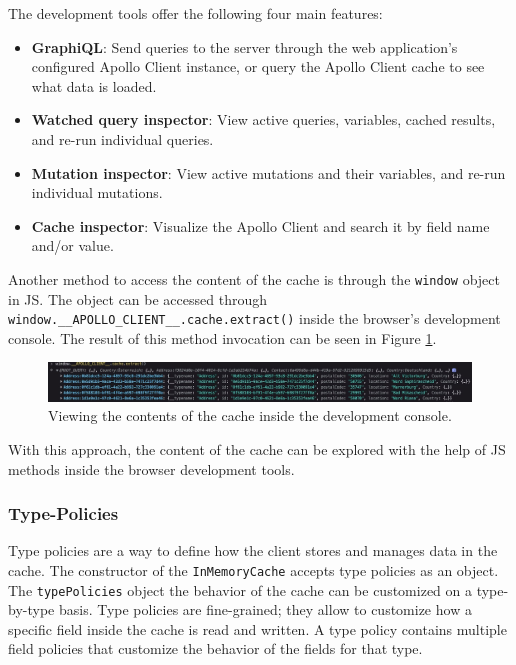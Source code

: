 \noindent The development tools offer the following four main features: \cite{misc:-:background:graphql:apollo-developer-tools}

\begin{itemize}
  \item \textbf{GraphiQL}: Send queries to the server through the web application's configured Apollo Client instance, or query the Apollo Client cache to see what data is loaded.
  \item \textbf{Watched query inspector}: View active queries, variables, cached results, and re-run individual queries.
  \item \textbf{Mutation inspector}: View active mutations and their variables, and re-run individual mutations.
  \item \textbf{Cache inspector}: Visualize the Apollo Client and search it by field name and/or value.
\end{itemize}

\noindent Another method to access the content of the cache is through the \texttt{window} object in \ac{JS}. The object can be accessed through \texttt{window.\_\_APOLLO\_CLIENT\_\_.cache.extract()} inside the browser's development console. The result of this method invocation can be seen in Figure \ref{fig:background:graphql:apollo:apollo-cache-browser-window}.

\ifshowImages
  \begin{figure}[H]
    \centering
    \includegraphics[width=1\linewidth]{images/background/graphql/apollo/apollo-cache-browser-window.jpg}
    \caption{Viewing the contents of the cache inside the development console.}\label{fig:background:graphql:apollo:apollo-cache-browser-window}
  \end{figure}
\fi

\noindent With this approach, the content of the cache can be explored with the help of \ac{JS} methods inside the browser development tools.

\subsubsection{Type-Policies}\label{subsubsection:background:graphql:apollo-server-client:type-policies}

Type policies are a way to define how the client stores and manages data in the cache. The constructor of the \texttt{InMemoryCache} accepts type policies as an object. The \texttt{typePolicies} object the behavior of the cache can be customized on a type-by-type basis. Type policies are fine-grained; they allow to customize how a specific field inside the cache is read and written. A type policy contains multiple field policies that customize the behavior of the fields for that type. \cite{misc:-:background:graphql:apollo-client-cache-reading-writing}

